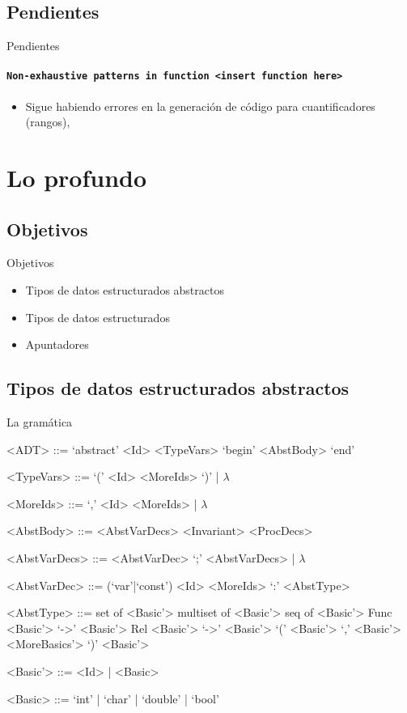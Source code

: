 \documentclass{beamer}
\begin{document}
\subsection{Pendientes}
\begin{frame}{Pendientes}
\framesubtitle{\texttt{Non-exhaustive patterns in function <insert function here>}}
\begin{itemize}
  \item Sigue habiendo errores en la generación de código para cuantificadores (rangos),
\end{itemize}
\end{frame}


\section{Lo profundo}
\subsection{Objetivos}
\begin{frame}{Objetivos}
\begin{itemize}
  \item Tipos de datos estructurados abstractos
  \item Tipos de datos estructurados
  \item Apuntadores
\end{itemize}
\end{frame}


\subsection{Tipos de datos estructurados abstractos}
\begin{frame}[fragile]{La gramática}
\scriptsize
\begin{grammar}

<ADT> ::= `abstract' <Id> <TypeVars> `begin' <AbstBody> `end'

<TypeVars> ::= `(' <Id> <MoreIds> `)' | $\lambda$

<MoreIds> ::= `,' <Id> <MoreIds> | $\lambda$

<AbstBody> ::= <AbstVarDecs> <Invariant> <ProcDecs>

<AbstVarDecs> ::= <AbstVarDec> `;' <AbstVarDecs> | $\lambda$

<AbstVarDec> ::= (`var'|`const') <Id> <MoreIds> `:' <AbstType>

<AbstType> ::= set of <Basic'>
\alt multiset of <Basic'>
\alt seq of <Basic'>
\alt Func <Basic'> `->' <Basic'>
\alt Rel <Basic'> `->' <Basic'>
\alt `(' <Basic'> `,' <Basic'> <MoreBasics'> `)'
\alt <Basic'>

<Basic'> ::= <Id> | <Basic>

<Basic> ::= `int' | `char' | `double' | `bool'

\end{grammar}
\end{frame}
\end{document}
